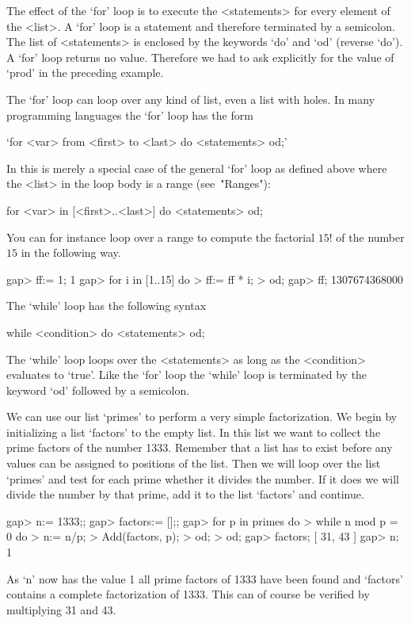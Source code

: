 The  effect of the `for'  loop  is to execute the <statements> for  every
element  of  the <list>.   A `for'  loop  is  a  statement  and therefore
terminated by a semicolon.  The list of <statements>  is enclosed by  the
keywords `do' and `od'  (reverse  `do').  A `for'  loop returns no value.
Therefore we had to ask explicitly for the value of `prod' in the
preceding example.

The `for' loop can loop over any kind of list, even a list with holes.
In many programming languages the `for' loop has the form

`for <var> from <first> to <last> do <statements> od;'

In {\GAP} this is merely a special case of the general `for' loop as defined
above where the <list> in the loop body is a range (see~"Ranges"):

\)\fmark for <var> in [<first>..<last>] do <statements>  od;

You can for  instance loop over a range to compute the factorial $15!$
of the number $15$ in the following way.

\beginexample
gap> ff:= 1;
1
gap> for i in [1..15] do
>       ff:= ff * i;
>    od;
gap> ff;
1307674368000
\endexample

The  `while' loop has the following syntax

\)\fmark while <condition> do <statements>  od; 

The `while'  loop loops over the <statements>  as long as  the 
<condition> evaluates  to  `true'. Like the `for' loop the `while' loop 
is terminated by the keyword `od' followed by a semicolon.

We can use  our list `primes' to perform a very simple factorization.  We
begin by  initializing a list `factors' to the empty list.   In this list
we want to collect the prime factors of the number 1333.  Remember that a
list has to exist  before any values  can be assigned to positions of the
list.  Then we  will loop over the list `primes' and  test for each prime
whether it divides the  number.  If it does we will  divide the number by
that prime, add it to the list `factors' and continue.

\beginexample
gap> n:= 1333;;
gap> factors:= [];;
gap> for p in primes do
>       while n mod p = 0 do
>          n:= n/p;
>          Add(factors, p);
>       od;
>    od;
gap> factors;
[ 31, 43 ]
gap> n;
1
\endexample

As `n' now has the value 1 all prime factors  of 1333 have been found and
`factors' contains a complete factorization of  1333.  This can of course
be verified by multiplying 31 and 43.

